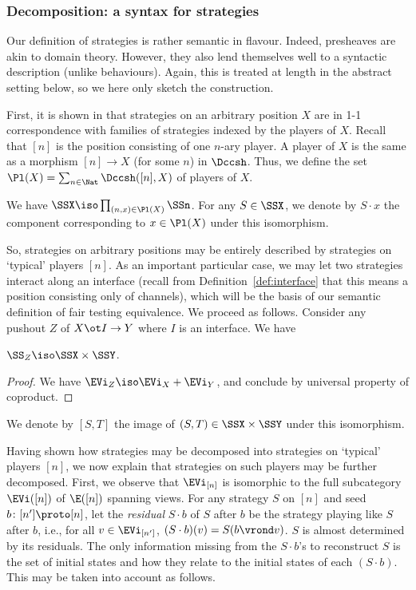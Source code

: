 \documentclass{LMCS}
\theoremstyle{plain}\newtheorem{satz}[thm]{Satz}
\begin{document}
\subsubsection{Decomposition: a syntax for strategies}\label{subsubsec:syntax}
Our definition of strategies is rather semantic in flavour. Indeed,
presheaves are akin to domain theory. However, they also lend
themselves well to a syntactic description (unlike behaviours). Again,
this is treated at length in the abstract setting below, so we here
only sketch the construction.

First, it is shown in  that strategies on an arbitrary position $X$
are in 1-1 correspondence with families of strategies indexed by the
players of $X$. Recall that $[n]$ is the position consisting of one
$n$-ary player. A player of $X$ is the same as a morphism $[n] \to X$
(for some $n$) in $\Dccsh$. Thus, we define the set $\Pl (X) = \sum_{n
  \in \Nat} \Dccsh ([n],X)$ of players of $X$.
\begin{prop}
We have  $\SSX \iso \prod_{(n,x) \in \Pl (X)} \SSn$. For any $S \in \SSX$, we denote by $S \cdot x$ the component corresponding
to $x \in \Pl (X)$ under this isomorphism.
\end{prop}
So, strategies on arbitrary positions may be entirely described by
strategies on `typical' players $[n]$. As an important particular
case, we may let two strategies interact along an interface (recall
from Definition~\ref{def:interface} that this means a position
consisting only of channels), which will be the basis of our semantic
definition of fair testing equivalence. We proceed as follows.
Consider any pushout $Z$ of $X \ot I \to Y$ where $I$ is an
interface. We have
\begin{cor}
  $\SS_Z \iso \SSX \times \SSY$.
\end{cor}
\begin{proof}
  We have $\EVi_Z \iso \EVi_X + \EVi_Y$, and conclude by universal
  property of coproduct.
\end{proof}
We denote by $[S,T]$ the image of $(S,T) \in \SSX \times \SSY$ under
this isomorphism.

Having shown how strategies may be decomposed into strategies on
`typical' players $[n]$, we now explain that strategies on such
players may be further decomposed. First, we observe that $\EVi_{[n]}$
is isomorphic to the full subcategory $\EVi([n])$ of $\E([n])$
spanning views.  For any strategy $S$ on $[n]$ and seed $b \colon [n']
\proto [n]$, let the \emph{residual} $S \cdot b$ of $S$ after $b$ be
the strategy playing like $S$ after $b$, i.e., for all $v \in
\EVi_{[n']}$, $(S \cdot b)(v) = S (b \vrond v)$. $S$ is almost
determined by its residuals. The only information missing from the
$S\cdot b$'s to reconstruct $S$ is the set of initial states and how
they relate to the initial states of each $(S \cdot b)$. This may be
taken into account as follows.
\end{document}
